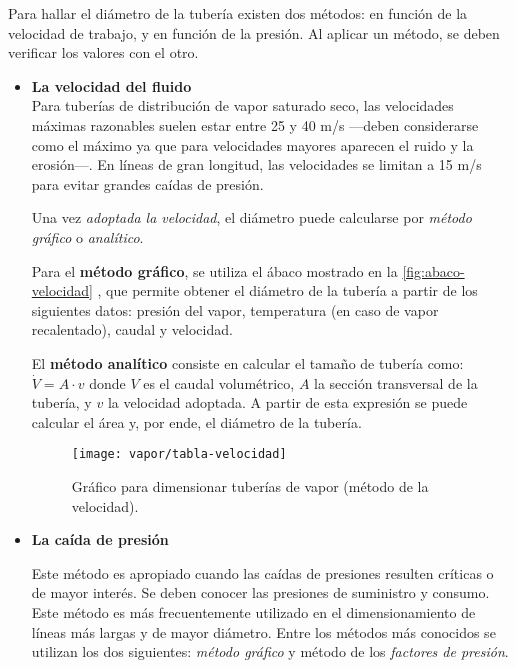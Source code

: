     Para hallar el diámetro de la tubería existen dos métodos: en función de la velocidad de trabajo, y en función de la presión. Al aplicar un método, se deben verificar los valores con el otro.
    \begin{itemize}
        \item \textbf{La velocidad del fluido}\\
        Para tuberías de distribución de vapor saturado seco, las velocidades máximas razonables suelen estar entre 25 y 40 m/s —deben considerarse como el máximo ya que para velocidades mayores aparecen el ruido y la erosión—. En líneas de gran longitud, las velocidades se limitan a 15 m/s para evitar grandes caídas de presión.


        Una vez \emph{adoptada la velocidad}, el diámetro puede calcularse por \emph{método gráfico} o \emph{analítico}.
        
        Para el \textbf{método gráfico}, se utiliza el ábaco mostrado en la \autoref{fig:abaco-velocidad} \parencite[pág. 16]{sarco-distribucion}, que permite obtener el diámetro de la tubería a partir de los siguientes datos: presión del vapor, temperatura (en caso de vapor recalentado), caudal y velocidad.
        
        El \textbf{método analítico} consiste en calcular el tamaño de tubería como: \(\dot{V}=A \cdot v\) donde $V$ es el caudal volumétrico, $A$ la sección transversal de la tubería, y $v$ la velocidad adoptada. A partir de esta expresión se puede calcular el área y, por ende, el diámetro de la tubería.

        \begin{figure}[H]
            \centering
            \caption{Gráfico para dimensionar tuberías de vapor (método de la velocidad).}\label{fig:abaco-velocidad}
            \texttt{[image: vapor/tabla-velocidad]}
        \end{figure}
        
        \item \textbf{La caída de presión} 
        
        Este método es apropiado cuando las caídas de presiones resulten críticas o de mayor interés. Se deben conocer las presiones de suministro y consumo. Este método es más frecuentemente utilizado en el dimensionamiento de líneas más largas y de mayor diámetro. Entre los métodos más conocidos se utilizan los dos siguientes: \emph{método gráfico} y método de los \emph{factores de presión}.
        

\end{itemize}
